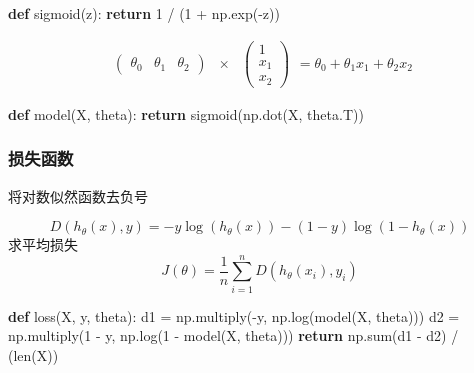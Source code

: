 \documentclass[
]{article}
\newenvironment{Shaded}{}{}
\newcommand{\BuiltInTok}[1]{#1}
\newcommand{\ControlFlowTok}[1]{\textcolor[rgb]{0.00,0.44,0.13}{\textbf{#1}}}
\newcommand{\DecValTok}[1]{\textcolor[rgb]{0.25,0.63,0.44}{#1}}
\newcommand{\KeywordTok}[1]{\textcolor[rgb]{0.00,0.44,0.13}{\textbf{#1}}}
\newcommand{\NormalTok}[1]{#1}
\newcommand{\OperatorTok}[1]{\textcolor[rgb]{0.40,0.40,0.40}{#1}}
\begin{document}
\begin{Shaded}
\begin{Highlighting}[]
\KeywordTok{def}\NormalTok{ sigmoid(z):}
    \ControlFlowTok{return} \DecValTok{1} \OperatorTok{/}\NormalTok{ (}\DecValTok{1} \OperatorTok{+}\NormalTok{ np.exp(}\OperatorTok{{-}}\NormalTok{z))}
\end{Highlighting}
\end{Shaded}

\[
\begin{array}{ccc}
\begin{pmatrix}\theta_{0} & \theta_{1} & \theta_{2}\end{pmatrix} & \times & \begin{pmatrix}1\\
x_{1}\\
x_{2}
\end{pmatrix}\end{array}=\theta_{0}+\theta_{1}x_{1}+\theta_{2}x_{2}
\]

\begin{Shaded}
\begin{Highlighting}[]
\KeywordTok{def}\NormalTok{ model(X, theta):}
    \ControlFlowTok{return}\NormalTok{ sigmoid(np.dot(X, theta.T))}
\end{Highlighting}
\end{Shaded}

\hypertarget{ux635fux5931ux51fdux6570}{%
\subsubsection{损失函数}\label{ux635fux5931ux51fdux6570}}

将对数似然函数去负号

\[
D(h_\theta(x), y) = -y\log(h_\theta(x)) - (1-y)\log(1-h_\theta(x))
\] 求平均损失 \[
J(\theta)=\frac{1}{n}\sum_{i=1}^{n} D(h_\theta(x_i), y_i)
\]

\begin{Shaded}
\begin{Highlighting}[]
\KeywordTok{def}\NormalTok{ loss(X, y, theta):}
\NormalTok{    d1 }\OperatorTok{=}\NormalTok{ np.multiply(}\OperatorTok{{-}}\NormalTok{y, np.log(model(X, theta)))}
\NormalTok{    d2 }\OperatorTok{=}\NormalTok{ np.multiply(}\DecValTok{1} \OperatorTok{{-}}\NormalTok{ y, np.log(}\DecValTok{1} \OperatorTok{{-}}\NormalTok{ model(X, theta)))}
    \ControlFlowTok{return}\NormalTok{ np.}\BuiltInTok{sum}\NormalTok{(d1 }\OperatorTok{{-}}\NormalTok{ d2) }\OperatorTok{/}\NormalTok{ (}\BuiltInTok{len}\NormalTok{(X))}
\end{Highlighting}
\end{Shaded}
\end{document}
